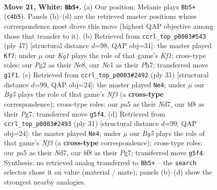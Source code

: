 \documentclass[11pt]{article}
\begin{document}
\clearpage

\begin{figure}[p]\centering
\begin{subfigure}{0.46\textwidth}\centering
\resizebox{\linewidth}{!}{%
\newchessgame
\chessboard[
  setfen={rn2bbr1/1p4np/2k1p1p1/p1P3B1/P1B1P3/2N5/1P3RPP/3RN1K1 w - - 4 21},
  showmover=false,
  pgfstyle=straightmove, color=movearrow, markmove={c4-b5}
]}
\caption{}
\end{subfigure}\hfill
\begin{subfigure}{0.46\textwidth}\centering
\resizebox{\linewidth}{!}{%
\newchessgame
\chessboard[
  setfen={3rnk1r/2p3pp/1bp1bp2/8/pP2P2P/3B4/1BPN1P2/R3K1R1 b - - 3 24},
  showmover=false,
  pgfstyle=straightmove, color=movearrow, markmove={f8-f7}
]}
\caption{}
\end{subfigure}
\\[4pt]
\begin{subfigure}{0.46\textwidth}\centering
\resizebox{\linewidth}{!}{%
\newchessgame
\chessboard[
  setfen={5rk1/1b1n1ppp/p3pn2/1p6/3P3N/6P1/PPrBPPBP/1R2K2R b K - 2 16},
  showmover=false,
  pgfstyle=straightmove, color=movearrow, markmove={f6-e4}
]}
\caption{}
\end{subfigure}\hfill
\begin{subfigure}{0.46\textwidth}\centering
\resizebox{\linewidth}{!}{%
\newchessgame
\chessboard[
  setfen={5rk1/1b1n1ppp/p3pn2/1p6/3P3N/6P1/PPrBPPBP/1R2K2R b K - 2 16},
  showmover=false,
  pgfstyle=straightmove, color=movearrow, markmove={f6-e4}
]}
\caption{}
\end{subfigure}
\caption{\textbf{Move 21, White: \texttt{Bb5+}.} (a) Our position; Melanie plays \texttt{Bb5+} (\texttt{c4b5}). Panels (b)--(d) are the retrieved master positions whose correspondence most drove this move (highest QAP objective among those that transfer to it). (b) Retrieved from \texttt{ccrl\_top\_p0003\#543} (ply 47) [structural distance $d$=98, QAP obj=31]: the master played \texttt{Kf7}; under $\mu$ our \emph{Kg1} plays the role of that game's \emph{Kf1}; cross-type roles: our \emph{P}g2 as their \emph{N}e8, our \emph{N}e1 as their \emph{P}h7; transferred move \texttt{g1f1}. (c) Retrieved from \texttt{ccrl\_top\_p0003\#2492} (ply 31) [structural distance $d$=99, QAP obj=24]: the master played \texttt{Ne4}; under $\mu$ our \emph{Bg5} plays the role of that game's \emph{Nf3} (a \textbf{cross-type} correspondence); cross-type roles: our \emph{p}a5 as their \emph{N}d7, our \emph{b}f8 as their \emph{P}g7; transferred move \texttt{g5f4}. (d) Retrieved from \texttt{ccrl\_top\_p0003\#2493} (ply 31) [structural distance $d$=99, QAP obj=24]: the master played \texttt{Ne4}; under $\mu$ our \emph{Bg5} plays the role of that game's \emph{Nf3} (a \textbf{cross-type} correspondence); cross-type roles: our \emph{p}a5 as their \emph{N}d7, our \emph{b}f8 as their \emph{P}g7; transferred move \texttt{g5f4}. Synthesis: no retrieved analog transferred to \texttt{Bb5+} -- the \texttt{search} selector chose it on value (material / mate); panels (b)--(d) show the strongest nearby analogies.}
\label{fig:thought-m40}
\end{figure}
\end{document}
